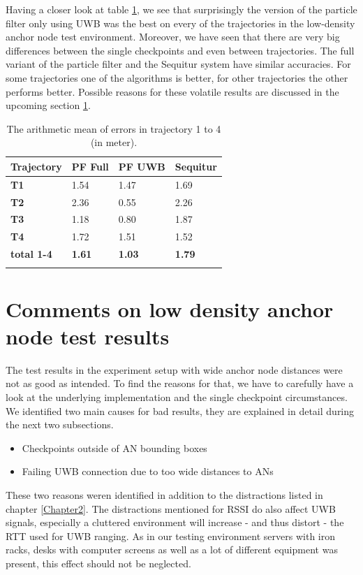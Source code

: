 Having a closer look at table \ref{tab:arithmetic_errors}, we see that surprisingly the version of the particle filter only using UWB was the best on every of the trajectories in the low-density anchor node test environment. Moreover, we have seen that there are very big differences between the single checkpoints and even between trajectories. The full variant of the particle filter and the Sequitur system have similar accuracies. For some trajectories one of the algorithms is better, for other trajectories the other performs better. Possible reasons for these volatile results are discussed in the upcoming section \ref{Section2}. 

\begin{table}
\caption{The arithmetic mean of errors in trajectory 1 to 4 (in meter).}
\label{tab:arithmetic_errors}
\centering
\begin{tabular}{l l l l}
\toprule
\textbf{Trajectory} & \textbf{PF Full} & \textbf{PF UWB} & \textbf{Sequitur}\\
\midrule
\textbf{T1} & 1.54 & 1.47 & 1.69\\
\textbf{T2} & 2.36 & 0.55 & 2.26\\
\textbf{T3} & 1.18 & 0.80 & 1.87\\
\textbf{T4} & 1.72 & 1.51 & 1.52\\
\midrule
\textbf{total 1-4}  & \textbf{1.61} & \textbf{1.03} & \textbf{1.79}\\
\bottomrule\\
\end{tabular}
\end{table}


\section{Comments on low density anchor node test results}
\label{Section2}
The test results in the experiment setup with wide anchor node distances were not as good as intended. To find the reasons for that, we have to carefully have a look at the underlying implementation and the single checkpoint circumstances. We identified two main causes for bad results, they are explained in detail during the next two subsections.
\begin{itemize}
\item Checkpoints outside of AN bounding boxes
\item Failing UWB connection due to too wide distances to ANs
\end{itemize}
These two reasons weren identified in addition to the distractions listed in chapter \ref{Chapter2}. The distractions mentioned for RSSI do also affect UWB signals, especially a cluttered environment will increase - and thus distort - the RTT used for UWB ranging. As in our testing environment servers with iron racks, desks with computer screens as well as a lot of different equipment was present, this effect should not be neglected.

